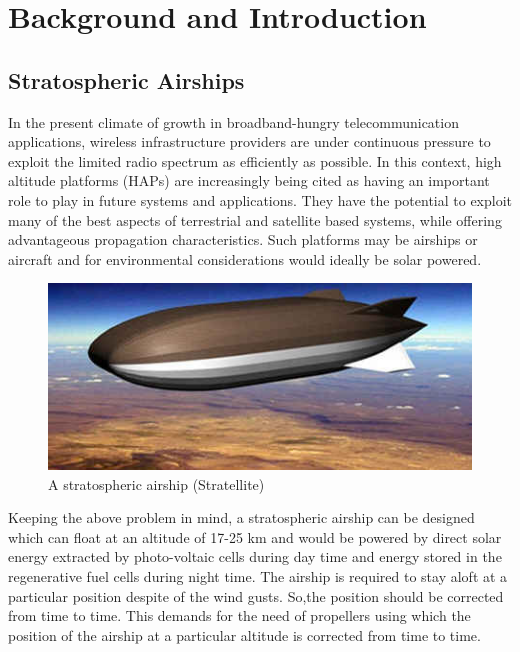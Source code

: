 
\newcommand{\etas}{\ensuremath{\eta_{\mathrm{s}}}}


\chapter{Background and Introduction}

\section{Stratospheric Airships}
In the present climate of growth in broadband-hungry telecommunication applications, wireless infrastructure providers are under continuous pressure to exploit the limited radio spectrum as efficiently as possible. In this context, high altitude platforms (HAPs) are increasingly being cited as having an important role to play in future systems and applications. They have the potential to exploit many of the best aspects of terrestrial and satellite based systems, while offering advantageous propagation characteristics. Such platforms may be airships or aircraft and for environmental considerations would ideally be solar powered.
\begin{figure}[htbp]
	\centering
	\includegraphics{intro/Stratellite.jpg}
	\caption{A stratospheric airship (Stratellite)}
	\label{Stratellite} %
\end{figure}

Keeping the above problem in mind, a stratospheric airship can be designed which can float at an altitude of 17-25 km and would be powered by direct solar energy extracted by photo-voltaic cells during day time and energy stored in the regenerative fuel cells during night time. The airship is required to stay aloft at a particular position despite of the wind gusts. So,the position should be corrected from time to time. This demands for the need of propellers using which the position of the airship at a particular altitude is corrected from time to time.

